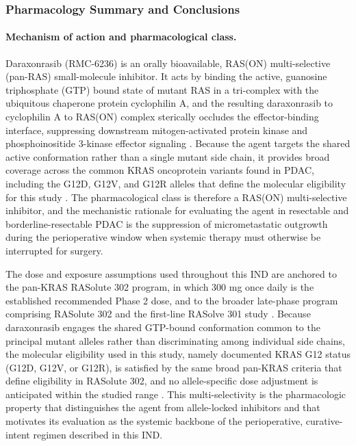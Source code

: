 \subsubsection{Pharmacology Summary and Conclusions}

\paragraph{Mechanism of action and pharmacological class.}
Daraxonrasib (RMC-6236) is an orally bioavailable, RAS(ON) multi-selective
(pan-RAS) small-molecule inhibitor. It acts by binding the active, guanosine
triphosphate (GTP) bound state of mutant RAS in a tri-complex with the
ubiquitous chaperone protein cyclophilin A, and the resulting daraxonrasib to
cyclophilin A to RAS(ON) complex sterically occludes the effector-binding
interface, suppressing downstream mitogen-activated protein kinase and
phosphoinositide 3-kinase effector signaling \cite{daraxwhipple}. Because the
agent targets the shared active conformation rather than a single mutant side
chain, it provides broad coverage across the common KRAS oncoprotein variants
found in PDAC, including the G12D, G12V, and G12R alleles that define the
molecular eligibility for this study \cite{daraxwhipple,onpremwhippl}. The
pharmacological class is therefore a RAS(ON) multi-selective inhibitor, and the
mechanistic rationale for evaluating the agent in resectable and
borderline-resectable PDAC is the suppression of micrometastatic outgrowth
during the perioperative window when systemic therapy must otherwise be
interrupted for surgery. 

The dose and exposure assumptions used throughout this
IND are anchored to the pan-KRAS RASolute 302 program, in which 300 mg once
daily is the established recommended Phase 2 dose, and to the broader late-phase
program comprising RASolute 302 and the first-line RASolve 301 study
\cite{daraxwhipple}. Because daraxonrasib engages the shared GTP-bound
conformation common to the principal mutant alleles rather than discriminating
among individual side chains, the molecular eligibility used in this study, namely
documented KRAS G12 status (G12D, G12V, or G12R), is satisfied by the same broad
pan-KRAS criteria that define eligibility in RASolute 302, and no allele-specific
dose adjustment is anticipated within the studied range
\cite{daraxwhipple,onpremwhippl}. This multi-selectivity is the pharmacologic
property that distinguishes the agent from allele-locked inhibitors and that
motivates its evaluation as the systemic backbone of the perioperative,
curative-intent regimen described in this IND.

